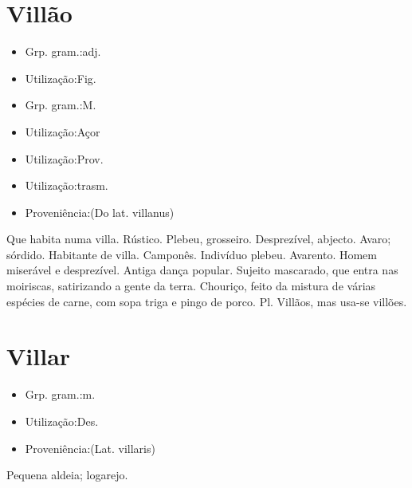 \documentclass{article}
\begin{document}
\section{Villão}
\begin{itemize}
\item {Grp. gram.:adj.}
\end{itemize}
\begin{itemize}
\item {Utilização:Fig.}
\end{itemize}
\begin{itemize}
\item {Grp. gram.:M.}
\end{itemize}
\begin{itemize}
\item {Utilização:Açor}
\end{itemize}
\begin{itemize}
\item {Utilização:Prov.}
\end{itemize}
\begin{itemize}
\item {Utilização:trasm.}
\end{itemize}
\begin{itemize}
\item {Proveniência:(Do lat. \textunderscore villanus\textunderscore )}
\end{itemize}
Que habita numa villa.
Rústico.
Plebeu, grosseiro.
Desprezível, abjecto.
Avaro; sórdido.
Habitante de villa.
Camponês.
Indivíduo plebeu.
Avarento.
Homem miserável e desprezível.
Antiga dança popular.
Sujeito mascarado, que entra nas moiriscas, satirizando a gente da terra.
Chouriço, feito da mistura de várias espécies de carne, com sopa triga e pingo de porco.
Pl. \textunderscore Villãos\textunderscore , mas usa-se \textunderscore villões\textunderscore .
\section{Villar}
\begin{itemize}
\item {Grp. gram.:m.}
\end{itemize}
\begin{itemize}
\item {Utilização:Des.}
\end{itemize}
\begin{itemize}
\item {Proveniência:(Lat. \textunderscore villaris\textunderscore )}
\end{itemize}
Pequena aldeia; logarejo.
\end{document}

